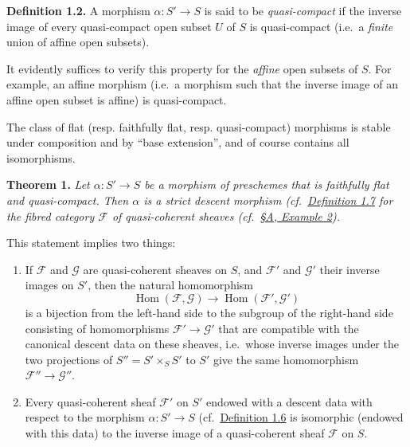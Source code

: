 \documentclass{article}
\newenvironment{itenv}[1]
  {\phantomsection\par\smallskip\noindent\textbf{#1.}\itshape}
  {\par\smallskip}
\newenvironment{rmenv}[1]
  {\phantomsection\par\smallskip\noindent\textbf{#1.}\rmfamily}
  {\par\smallskip}
\theoremstyle{definition}
\theoremstyle{definition}
\theoremstyle{definition}
\theoremstyle{definition}
\theoremstyle{remark}
\begin{document}
\leavevmode{}%
\begin{rmenv}{Definition 1.2}
A morphism \(\alpha\colon S'\to S\) is said to be \emph{quasi-compact} if the inverse image of every quasi-compact open subset \(U\) of \(S\) is quasi-compact (i.e.~a \emph{finite} union of affine open subsets).

\end{rmenv}

It evidently suffices to verify this property for the \emph{affine} open subsets of \(S\).
For example, an affine morphism (i.e.~a morphism such that the inverse image of an affine open subset is affine) is quasi-compact.

The class of flat (resp. faithfully flat, resp. quasi-compact) morphisms is stable under composition and by ``base extension'', and of course contains all isomorphisms.

\leavevmode{}%
\begin{itenv}{Theorem 1}
Let \(\alpha\colon S'\to S\) be a morphism of preschemes that is \emph{faithfully flat} and \emph{quasi-compact}.
Then \(\alpha\) is a \emph{strict descent morphism} (cf.~\protect\hyperlink{fga-3-i-section-A.1-definition-1.7}{Definition 1.7} for the fibred category \({\mathcal{F}}\) of quasi-coherent sheaves (cf.~\protect\hyperlink{fga-3-i-section-A.1-example-2}{§A, Example 2}).

\end{itenv}

This statement implies two things:

\begin{enumerate}
\def\labelenumi{\roman{enumi}.}
\item
  If \({\mathcal{F}}\) and \({\mathscr{G}}\) are quasi-coherent sheaves on \(S\), and \({\mathcal{F}}'\) and \({\mathscr{G}}'\) their inverse images on \(S'\), then the natural homomorphism
  \[
   \operatorname{Hom}({\mathcal{F}},{\mathscr{G}}) \to \operatorname{Hom}({\mathcal{F}}',{\mathscr{G}}')
    \]
  is a bijection from the left-hand side to the subgroup of the right-hand side consisting of homomorphisms \({\mathcal{F}}'\to{\mathscr{G}}'\) that are compatible with the canonical descent data on these sheaves, i.e.~whose inverse images under the two projections of \(S''=S'\times_S S'\) to \(S'\) give the same homomorphism \({\mathcal{F}}''\to{\mathscr{G}}''\).
\item
  Every quasi-coherent sheaf \({\mathcal{F}}'\) on \(S'\) endowed with a descent data with respect to the morphism \(\alpha\colon S'\to S\) (cf.~\protect\hyperlink{fga-3-i-section-A.1-definition-1.6}{Definition 1.6} is isomorphic (endowed with this data) to the inverse image of a quasi-coherent sheaf \({\mathcal{F}}\) on \(S\).
\end{enumerate}
\end{document}
